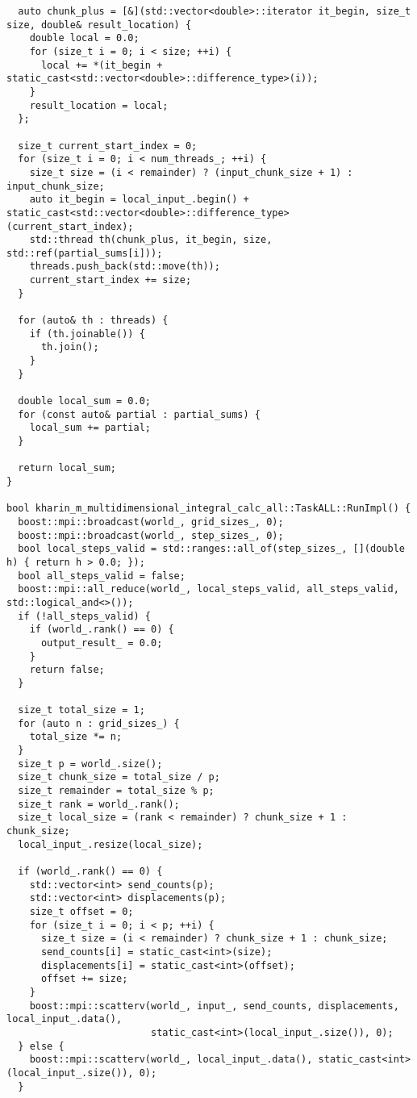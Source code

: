 \documentclass[12pt]{article}
\begin{document}
\begin{lstlisting}
  auto chunk_plus = [&](std::vector<double>::iterator it_begin, size_t size, double& result_location) {
    double local = 0.0;
    for (size_t i = 0; i < size; ++i) {
      local += *(it_begin + static_cast<std::vector<double>::difference_type>(i));
    }
    result_location = local;
  };

  size_t current_start_index = 0;
  for (size_t i = 0; i < num_threads_; ++i) {
    size_t size = (i < remainder) ? (input_chunk_size + 1) : input_chunk_size;
    auto it_begin = local_input_.begin() + static_cast<std::vector<double>::difference_type>(current_start_index);
    std::thread th(chunk_plus, it_begin, size, std::ref(partial_sums[i]));
    threads.push_back(std::move(th));
    current_start_index += size;
  }

  for (auto& th : threads) {
    if (th.joinable()) {
      th.join();
    }
  }

  double local_sum = 0.0;
  for (const auto& partial : partial_sums) {
    local_sum += partial;
  }

  return local_sum;
}

bool kharin_m_multidimensional_integral_calc_all::TaskALL::RunImpl() {
  boost::mpi::broadcast(world_, grid_sizes_, 0);
  boost::mpi::broadcast(world_, step_sizes_, 0);
  bool local_steps_valid = std::ranges::all_of(step_sizes_, [](double h) { return h > 0.0; });
  bool all_steps_valid = false;
  boost::mpi::all_reduce(world_, local_steps_valid, all_steps_valid, std::logical_and<>());
  if (!all_steps_valid) {
    if (world_.rank() == 0) {
      output_result_ = 0.0;
    }
    return false;
  }

  size_t total_size = 1;
  for (auto n : grid_sizes_) {
    total_size *= n;
  }
  size_t p = world_.size();
  size_t chunk_size = total_size / p;
  size_t remainder = total_size % p;
  size_t rank = world_.rank();
  size_t local_size = (rank < remainder) ? chunk_size + 1 : chunk_size;
  local_input_.resize(local_size);

  if (world_.rank() == 0) {
    std::vector<int> send_counts(p);
    std::vector<int> displacements(p);
    size_t offset = 0;
    for (size_t i = 0; i < p; ++i) {
      size_t size = (i < remainder) ? chunk_size + 1 : chunk_size;
      send_counts[i] = static_cast<int>(size);
      displacements[i] = static_cast<int>(offset);
      offset += size;
    }
    boost::mpi::scatterv(world_, input_, send_counts, displacements, local_input_.data(),
                         static_cast<int>(local_input_.size()), 0);
  } else {
    boost::mpi::scatterv(world_, local_input_.data(), static_cast<int>(local_input_.size()), 0);
  }


\end{lstlisting}
\end{document}
